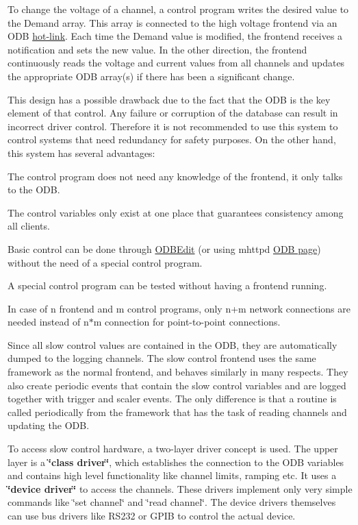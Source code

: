 To change the voltage of a channel, a control program writes the desired value to the Demand array. This array is connected to the high voltage frontend via an ODB \hyperlink{RC_Hot_Link}{hot-\/link}. Each time the Demand value is modified, the frontend receives a notification and sets the new value. In the other direction, the frontend continuously reads the voltage and current values from all channels and updates the appropriate ODB array(s) if there has been a significant change.

This design has a possible drawback due to the fact that the ODB is the key element of that control. Any failure or corruption of the database can result in incorrect driver control. Therefore it is not recommended to use this system to control systems that need redundancy for safety purposes. On the other hand, this system has several advantages:


\begin{DoxyItemize}
\item The control program does not need any knowledge of the frontend, it only talks to the ODB.
\item The control variables only exist at one place that guarantees consistency among all clients.
\item Basic control can be done through \hyperlink{RC_odbedit_utility}{ODBEdit} (or using mhttpd \hyperlink{RC_mhttpd_ODB_page}{ODB page}) without the need of a special control program.
\item A special control program can be tested without having a frontend running.
\item In case of n frontend and m control programs, only n+m network connections are needed instead of n$\ast$m connection for point-\/to-\/point connections.
\end{DoxyItemize}

Since all slow control values are contained in the ODB, they are automatically dumped to the logging channels. The slow control frontend uses the same framework as the normal frontend, and behaves similarly in many respects. They also create periodic events that contain the slow control variables and are logged together with trigger and scaler events. The only difference is that a routine is called periodically from the framework that has the task of reading channels and updating the ODB. \par
 \label{FE_Slow_Control_system_idx_slow-control_drivers}
\hypertarget{FE_Slow_Control_system_idx_slow-control_drivers}{}
 To access slow control hardware, a two-\/layer driver concept is used. The upper layer is a {\bfseries \char`\"{}class driver\char`\"{}}, which establishes the connection to the ODB variables and contains high level functionality like channel limits, ramping etc. It uses a {\bfseries \char`\"{}device driver\char`\"{}} to access the channels. These drivers implement only very simple commands like \char`\"{}set channel\char`\"{} and \char`\"{}read channel\char`\"{}. The device drivers themselves can use bus drivers like RS232 or GPIB to control the actual device.

